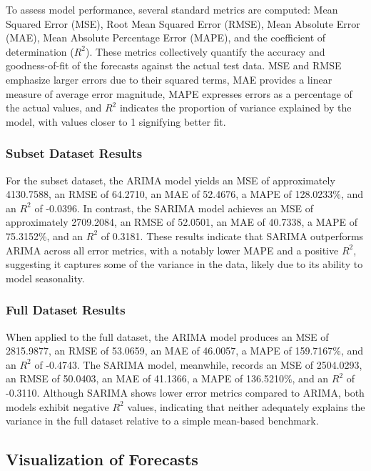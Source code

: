 	To assess model performance, several standard metrics are computed: Mean Squared Error (MSE), Root Mean Squared Error (RMSE), Mean Absolute Error (MAE), Mean Absolute Percentage Error (MAPE), and the coefficient of determination ($R^2$). These metrics collectively quantify the accuracy and goodness-of-fit of the forecasts against the actual test data. MSE and RMSE emphasize larger errors due to their squared terms, MAE provides a linear measure of average error magnitude, MAPE expresses errors as a percentage of the actual values, and $R^2$ indicates the proportion of variance explained by the model, with values closer to 1 signifying better fit.
	
	\subsubsection{Subset Dataset Results}
	
	For the subset dataset, the ARIMA model yields an MSE of approximately 4130.7588, an RMSE of 64.2710, an MAE of 52.4676, a MAPE of 128.0233\%, and an $R^2$ of -0.0396. In contrast, the SARIMA model achieves an MSE of approximately 2709.2084, an RMSE of 52.0501, an MAE of 40.7338, a MAPE of 75.3152\%, and an $R^2$ of 0.3181. These results indicate that SARIMA outperforms ARIMA across all error metrics, with a notably lower MAPE and a positive $R^2$, suggesting it captures some of the variance in the data, likely due to its ability to model seasonality.
	
	\subsubsection{Full Dataset Results}
	
	When applied to the full dataset, the ARIMA model produces an MSE of 2815.9877, an RMSE of 53.0659, an MAE of 46.0057, a MAPE of 159.7167\%, and an $R^2$ of -0.4743. The SARIMA model, meanwhile, records an MSE of 2504.0293, an RMSE of 50.0403, an MAE of 41.1366, a MAPE of 136.5210\%, and an $R^2$ of -0.3110. Although SARIMA shows lower error metrics compared to ARIMA, both models exhibit negative $R^2$ values, indicating that neither adequately explains the variance in the full dataset relative to a simple mean-based benchmark.
	
	\subsection{Visualization of Forecasts}
	
